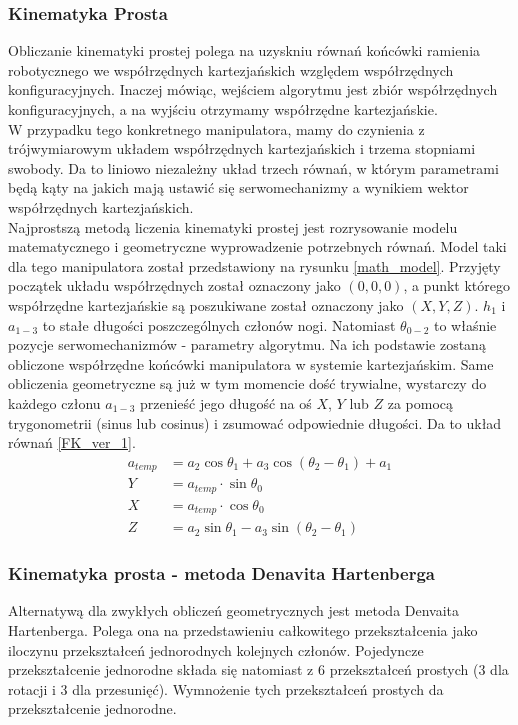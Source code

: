 \documentclass[a4paper,13pt]{article}
\begin{document}
\subsubsection{Kinematyka Prosta}
Obliczanie kinematyki prostej polega na uzyskniu równań końcówki ramienia robotycznego we współrzędnych kartezjańskich względem współrzędnych konfiguracyjnych. Inaczej mówiąc, wejściem algorytmu jest zbiór współrzędnych konfiguracyjnych, a na wyjściu otrzymamy współrzędne kartezjańskie.\cite{robot_manipulators}\\

W przypadku tego konkretnego manipulatora, mamy do czynienia z trójwymiarowym układem współrzędnych kartezjańskich i trzema stopniami swobody. Da to liniowo niezależny układ trzech równań, w którym parametrami będą kąty na jakich mają ustawić się serwomechanizmy a wynikiem wektor współrzędnych kartezjańskich.\\

Najprostszą metodą liczenia kinematyki prostej jest rozrysowanie modelu matematycznego i geometryczne wyprowadzenie potrzebnych równań. Model taki dla tego manipulatora został przedstawiony na rysunku \ref{math_model}. Przyjęty początek układu współrzędnych został oznaczony jako $(0, 0, 0)$, a punkt którego współrzędne kartezjańskie są poszukiwane został oznaczony jako $(X, Y, Z)$. $h_1$ i $a_{1-3}$ to stałe długości poszczególnych członów nogi. Natomiast $\theta_{0-2}$ to właśnie pozycje serwomechanizmów - parametry algorytmu. Na ich podstawie zostaną obliczone współrzędne końcówki manipulatora w systemie kartezjańskim. Same obliczenia geometryczne są już w tym momencie dość trywialne, wystarczy do każdego członu $a_{1-3}$ przenieść jego długość na oś $X$, $Y$ lub $Z$ za pomocą trygonometrii (sinus lub cosinus) i zsumować odpowiednie długości. Da to układ równań \ref{FK_ver_1}.\\

\begin{equation} \label{FK_ver_1}
\begin{split}
a_{temp} &= a_2 \cos{\theta_1} + a_3 \cos{\left(\theta_2 - \theta_1\right)} + a_1\\
Y &= a_{temp} \cdot \sin{\theta_0}\\
X &= a_{temp} \cdot \cos{\theta_0}\\
Z &= a_2 \sin{\theta_1} - a_3 \sin{\left(\theta_2 - \theta_1\right)}
\end{split}
\end{equation}

\subsubsection{Kinematyka prosta - metoda Denavita Hartenberga \cite{DH_AA_article}}
Alternatywą dla zwykłych obliczeń geometrycznych jest metoda Denvaita Hartenberga. Polega ona na przedstawieniu całkowitego przekształcenia jako iloczynu przekształceń jednorodnych kolejnych członów. Pojedyncze przekształcenie jednorodne składa się natomiast z 6 przekształceń prostych (3 dla rotacji i 3 dla przesunięć). Wymnożenie tych przekształceń prostych da przekształcenie jednorodne. \cite{DH_wpaszke_wyklad}\\
\end{document}
